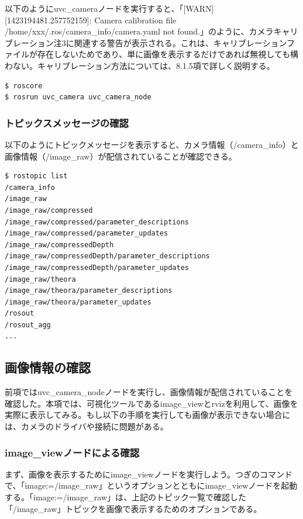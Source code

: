 以下のようにuvc\_cameraノードを実行すると、「[WARN] [1423194481.257752159]: Camera calibration file /home/xxx/.ros/camera\_info/camera.yaml not found.」のように、カメラキャリブレーション注3に関連する警告が表示される。これは、キャリブレーションファイルが存在しないためであり、単に画像を表示するだけであれば無視しても構わない。キャリブレーション方法については、8.1.5項で詳しく説明する。

\begin{lstlisting}[language=ROS]
$ roscore
$ rosrun uvc_camera uvc_camera_node
\end{lstlisting}

\subsubsection{トピックスメッセージの確認}

以下のようにトピックメッセージを表示すると、カメラ情報（/camera\_info）と画像情報（/image\_raw）が配信されていることが確認できる。

\begin{lstlisting}[language=ROS]
$ rostopic list
/camera_info
/image_raw
/image_raw/compressed
/image_raw/compressed/parameter_descriptions /image_raw/compressed/parameter_updates
/image_raw/compressedDepth
/image_raw/compressedDepth/parameter_descriptions /image_raw/compressedDepth/parameter_updates
/image_raw/theora
/image_raw/theora/parameter_descriptions
/image_raw/theora/parameter_updates
/rosout
/rosout_agg
...
\end{lstlisting}

\subsection{画像情報の確認}

前項ではuvc\_camera\_nodeノードを実行し、画像情報が配信されていることを確認した。本項では、可視化ツールであるimage\_viewとrvizを利用して、画像を実際に表示してみる。もし以下の手順を実行しても画像が表示できない場合には、カメラのドライバや接続に問題がある。

\subsubsection{image\_viewノードによる確認}

まず、画像を表示するためにimage\_viewノードを実行しよう。つぎのコマンドで、「image:=/image\_raw」というオプションとともにimage\_viewノードを起動する。「image:=/image\_raw」は、上記のトピック一覧で確認した「/image\_raw」トピックを画像で表示するためのオプションである。

